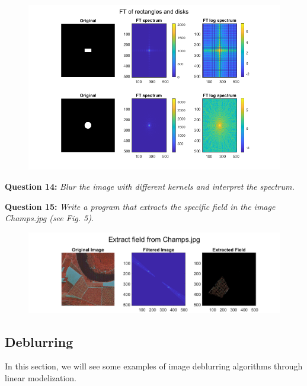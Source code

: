 \begin{figure}[H]
    \centering
    \includegraphics[width=\linewidth]{Doc/Graphics/Part1/Part1_Question13a.png}
\end{figure}




\textbf{Question 14:}
\textit{Blur the image with diﬀerent kernels and interpret the spectrum.}



\textbf{Question 15:}
\textit{Write a program that extracts the speciﬁc ﬁeld in the image Champs.jpg (see Fig. 5).}


\begin{figure}[H]
    \centering
    \includegraphics[width=\linewidth]{Doc/Graphics/Part1/Part1_Question15.png}
    \label{fig:enter-label}
\end{figure}


\subsection{Deblurring}
In this section, we will see some examples of image deblurring algorithms through linear modelization.

